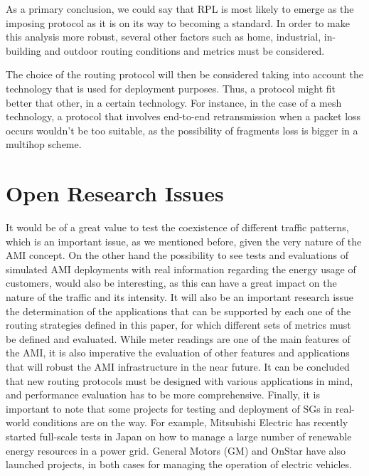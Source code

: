 \documentclass[11pt,draftclsnofoot,onecolumn]{IEEEtran}
\begin{document}
As a primary conclusion, we could say that RPL is most likely to emerge as the imposing protocol as it is on its way to becoming a standard. In order to make this analysis more robust, several other factors such as home, industrial, in-building and outdoor routing conditions and metrics must be considered.

The choice of the routing protocol will then be considered taking into account the technology that is used for deployment purposes. Thus, a protocol might fit better that other, in a certain technology. For instance, in the case of a mesh technology, a protocol that involves end-to-end retransmission when a packet loss occurs wouldn’t be too suitable, as the possibility of fragments loss is bigger in a multihop scheme.



\section{Open Research Issues}\label{issues}
It would be of a great value to test the coexistence of different traffic patterns, which is an important issue, as we mentioned before, given the very nature of the AMI concept. On the other hand the possibility to see tests and evaluations of simulated AMI deployments with real information regarding the energy usage of customers, would also be interesting, as this can have a great impact on the nature of the traffic and its intensity. It will also be an important research issue the determination of the applications that can be supported by each one of the routing strategies defined in this paper, for which different sets of metrics must be defined and evaluated. While meter readings are one of the main features of the AMI, it is also imperative the evaluation of other features and applications that will robust the AMI infrastructure in the near future. It can be concluded that new routing protocols must be designed with various applications in mind, and performance evaluation has to be more comprehensive. Finally, it is important to note that some projects for testing and deployment of SGs in real-world conditions are on the way. For example, Mitsubishi Electric has recently started full-scale tests in Japan on how to manage a large number of renewable energy resources in a power grid. General Motors (GM) and OnStar have also launched projects, in both cases for managing the operation of electric vehicles.


%
%
%
%
%
\end{document}
